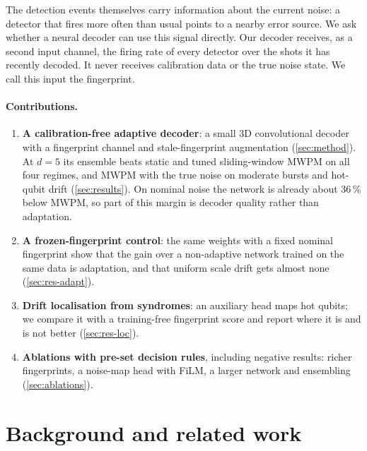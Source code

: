 \documentclass[11pt,a4paper]{article}
\begin{document}
The detection events themselves carry information about the current noise: a detector that fires more often
than usual points to a nearby error source. We ask whether a neural decoder can use this signal directly. Our
decoder receives, as a second input channel, the firing rate of every detector over the shots it has recently
decoded. It never receives calibration data or the true noise state. We call this input the fingerprint.

\paragraph{Contributions.}
\begin{enumerate}[label=(\alph*), leftmargin=2em]
  \item \textbf{A calibration-free adaptive decoder}: a small 3D convolutional decoder with a fingerprint channel and
        stale-fingerprint augmentation (\cref{sec:method}). At $d=5$ its ensemble beats static and tuned sliding-window
        MWPM on all four regimes, and MWPM with the true noise on moderate bursts and hot-qubit drift (\cref{sec:results}).
        On nominal noise the network is already about 36\,\% below MWPM, so part of this margin is decoder quality
        rather than adaptation.
  \item \textbf{A frozen-fingerprint control}: the same weights with a fixed nominal fingerprint show that the gain
        over a non-adaptive network trained on the same data is adaptation, and that uniform scale drift gets almost
        none (\cref{sec:res-adapt}).
  \item \textbf{Drift localisation from syndromes}: an auxiliary head maps hot qubits; we compare it with a
        training-free fingerprint score and report where it is and is not better (\cref{sec:res-loc}).
  \item \textbf{Ablations with pre-set decision rules}, including negative results: richer fingerprints, a noise-map
        head with FiLM, a larger network and ensembling (\cref{sec:ablations}).
\end{enumerate}

\section{Background and related work}\label{sec:background}
\end{document}
